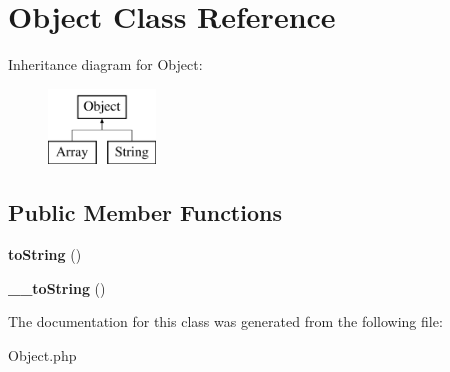 \hypertarget{classObject}{
\section{Object Class Reference}
\label{classObject}
}
Inheritance diagram for Object:\begin{figure}[H]
\begin{center}
\leavevmode
\includegraphics[height=2cm]{classObject}
\end{center}
\end{figure}
\subsection*{Public Member Functions}
\begin{DoxyCompactItemize}
\item 
\hypertarget{classObject_a624c31df2f7cadf888886e0407f26bbe}{
{\bfseries toString} ()}
\label{classObject_a624c31df2f7cadf888886e0407f26bbe}

\item 
\hypertarget{classObject_abfcbe6f8ec26dd60e658f9798bc77f14}{
{\bfseries \_\-\_\-toString} ()}
\label{classObject_abfcbe6f8ec26dd60e658f9798bc77f14}

\end{DoxyCompactItemize}


The documentation for this class was generated from the following file:\begin{DoxyCompactItemize}
\item 
Object.php\end{DoxyCompactItemize}
